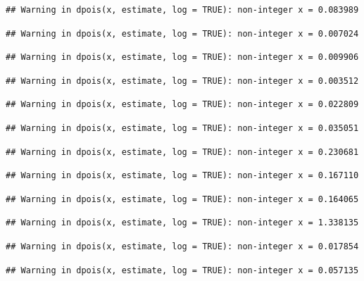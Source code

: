 \documentclass[]{article}
\begin{document}
\begin{verbatim}
## Warning in dpois(x, estimate, log = TRUE): non-integer x = 0.083989
\end{verbatim}

\begin{verbatim}
## Warning in dpois(x, estimate, log = TRUE): non-integer x = 0.007024
\end{verbatim}

\begin{verbatim}
## Warning in dpois(x, estimate, log = TRUE): non-integer x = 0.009906
\end{verbatim}

\begin{verbatim}
## Warning in dpois(x, estimate, log = TRUE): non-integer x = 0.003512
\end{verbatim}

\begin{verbatim}
## Warning in dpois(x, estimate, log = TRUE): non-integer x = 0.022809
\end{verbatim}

\begin{verbatim}
## Warning in dpois(x, estimate, log = TRUE): non-integer x = 0.035051
\end{verbatim}

\begin{verbatim}
## Warning in dpois(x, estimate, log = TRUE): non-integer x = 0.230681
\end{verbatim}

\begin{verbatim}
## Warning in dpois(x, estimate, log = TRUE): non-integer x = 0.167110
\end{verbatim}

\begin{verbatim}
## Warning in dpois(x, estimate, log = TRUE): non-integer x = 0.164065
\end{verbatim}

\begin{verbatim}
## Warning in dpois(x, estimate, log = TRUE): non-integer x = 1.338135
\end{verbatim}

\begin{verbatim}
## Warning in dpois(x, estimate, log = TRUE): non-integer x = 0.017854
\end{verbatim}

\begin{verbatim}
## Warning in dpois(x, estimate, log = TRUE): non-integer x = 0.057135
\end{verbatim}
\end{document}
